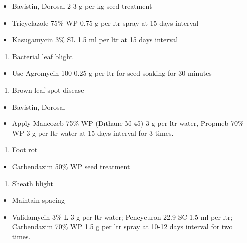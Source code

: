 \documentclass[
]{book}
\providecommand{\tightlist}{%
  \setlength{\itemsep}{0pt}\setlength{\parskip}{0pt}}
\begin{document}
\begin{itemize}
\tightlist
\item
  Bavistin, Dorosal 2-3 g per kg seed treatment
\item
  Tricyclazole 75\% WP 0.75 g per ltr spray at 15 days interval
\item
  Kasugamycin 3\% SL 1.5 ml per ltr at 15 days interval
\end{itemize}

\begin{enumerate}
\def\labelenumi{\arabic{enumi}.}
\setcounter{enumi}{1}
\tightlist
\item
  Bacterial leaf blight
\end{enumerate}

\begin{itemize}
\tightlist
\item
  Use Agromycin-100 0.25 g per ltr for seed soaking for 30 minutes
\end{itemize}

\begin{enumerate}
\def\labelenumi{\arabic{enumi}.}
\setcounter{enumi}{2}
\tightlist
\item
  Brown leaf spot disease
\end{enumerate}

\begin{itemize}
\tightlist
\item
  Bavistin, Dorosal
\item
  Apply Mancozeb 75\% WP (Dithane M-45) 3 g per ltr water, Propineb 70\% WP 3 g per ltr water at 15 days interval for 3 times.
\end{itemize}

\begin{enumerate}
\def\labelenumi{\arabic{enumi}.}
\setcounter{enumi}{3}
\tightlist
\item
  Foot rot
\end{enumerate}

\begin{itemize}
\tightlist
\item
  Carbendazim 50\% WP seed treatment
\end{itemize}

\begin{enumerate}
\def\labelenumi{\arabic{enumi}.}
\setcounter{enumi}{4}
\tightlist
\item
  Sheath blight
\end{enumerate}

\begin{itemize}
\tightlist
\item
  Maintain spacing
\item
  Validamycin 3\% L 3 g per ltr water; Pencycuron 22.9 SC 1.5 ml per ltr; Carbendazim 70\% WP 1.5 g per ltr spray at 10-12 days interval for two times.
\end{itemize}
\end{document}
